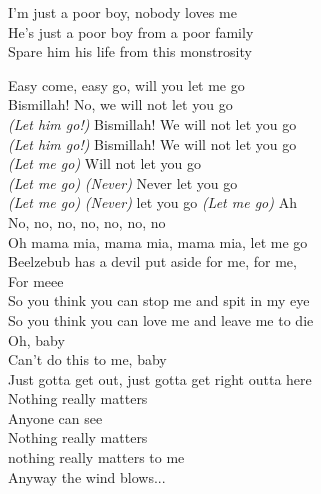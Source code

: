 I'm just a poor boy, nobody loves me\\
He's just a poor boy from a poor family\\
Spare him his life from this monstrosity\


Easy come, easy go, will you let me go\\
Bismillah! No, we will not let you go\\
\textit{(Let him go!)} Bismillah! We will not let you go\\
\textit{(Let him go!)} Bismillah! We will not let you go\\
\textit{(Let me go)} Will not let you go\\
\textit{(Let me go)} \textit{(Never)} Never let you go\\
\textit{(Let me go)} \textit{(Never)} let you go \textit{(Let me go)} Ah\\
No, no, no, no, no, no, no\\
Oh mama mia, mama mia, mama mia, let me go\\
Beelzebub has a devil put aside for me, for me,\\
For meee\\

So you think you can stop me and spit in my eye\\
So you think you can love me and leave me to die\\
Oh, baby\\
Can't do this to me, baby\\
Just gotta get out, just gotta get right outta here\\

Nothing really matters\\
Anyone can see\\
Nothing really matters\\
nothing really matters to me\\
Anyway the wind blows...
